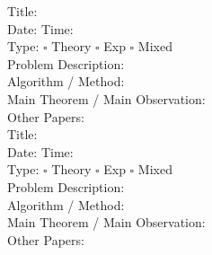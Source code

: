 \documentclass{article}
\begin{document}
\noindent
Title:\\
Date:\hspace{3cm} Time:\\
Type: $\square$ Theory $\square$ Exp $\square$ Mixed \\
\vspace{2cm}
Problem Description:\\
\vspace{5cm}
\noindent
Algorithm / Method:\\
\vspace{5cm}
Main Theorem / Main Observation:\\
Other Papers:\\
\newpage
\noindent
Title:\\
Date:\hspace{3cm} Time:\\
Type: $\square$ Theory $\square$ Exp $\square$ Mixed \\
\vspace{2cm}
Problem Description:\\
\vspace{5cm}
\noindent
Algorithm / Method:\\
\vspace{5cm}
Main Theorem / Main Observation:\\
Other Papers:\\
\end{document}

